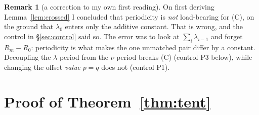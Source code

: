 \documentclass[11pt]{article}
\theoremstyle{definition}
\newtheorem{remark}[theorem]{Remark}
\begin{document}
\begin{remark}[a correction to my own first reading]
On first deriving Lemma~\ref{lem:crossed} I concluded that periodicity is \emph{not}
load-bearing for (C), on the ground that $\lambda_0$ enters only the additive constant. That
is wrong, and the control in §\ref{sec:control} said so. The error was to look at
$\sum_i\lambda_{i-1}$ and forget $R_m-R_0$: periodicity is what makes the one unmatched
pair differ by a constant. Decoupling the $\lambda$-period from the $\nu$-period breaks (C)
(control P3 below), while changing the offset \emph{value} $p=q$ does not (control P1).
\end{remark}

\section{Proof of Theorem~\ref{thm:tent}}\label{sec:prooftent}
\end{document}

